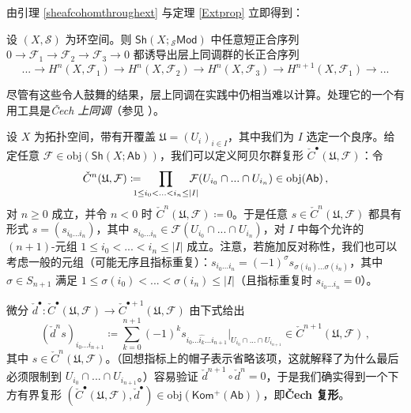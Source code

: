 由引理 \ref{sheafcohomthroughext} 与定理 \ref{Extprop} 立即得到：

\begin{Cor}\label{longexactforsheafcohomology}
设 $(X,\mathcal{S})$ 为环空间。则 $\mathsf{Sh}(X;{}_{\mathcal{S}}\mathsf{Mod})$ 中任意短正合序列 $0\rightarrow\mathcal{F}_1\rightarrow\mathcal{F}_2\rightarrow\mathcal{F}_3\rightarrow 0$ 都诱导出层上同调群的长正合序列
\[
...\rightarrow H^n(X,\mathcal{F}_1)\rightarrow H^n(X,\mathcal{F}_2)\rightarrow H^n(X,\mathcal{F}_3)\rightarrow H^{n+1}(X,\mathcal{F}_1)\rightarrow...
\]
\end{Cor}

\vspace*{0.5cm}
\noindent 尽管有这些令人鼓舞的结果，层上同调在实践中仍相当难以计算。处理它的一个有用工具是\textit{\v{C}ech 上同调}（参见 \cite[section III.4]{[Har77]}）。

\begin{Def}
设 $X$ 为拓扑空间，带有开覆盖 $\mathfrak{U}=(U_i)_{i\in I}$，其中我们为 $I$ 选定一个良序。给定任意 $\mathcal{F}\in\text{obj}(\mathsf{Sh}(X;\mathsf{Ab}))$，我们可以定义阿贝尔群复形 $\check{C}^\bullet(\mathfrak{U},\mathcal{F})$：令
\begin{equation}\label{Cechcomplex}
	\check{C}^n(\mathfrak{U},\mathcal{F})\coloneqq\mkern-18mu\prod_{\begin{small}1\leq i_0<...<i_n\leq |I|\end{small}}\mkern-18mu\mathcal{F}(U_{i_0}\cap ...\cap U_{i_n})\in\text{obj}(\mathsf{Ab})\,,
\end{equation}
对 $n\geq 0$ 成立，并令 $n<0$ 时 $\check{C}^n(\mathfrak{U},\mathcal{F})\coloneqq 0$。于是任意 $s\in \check{C}^n(\mathfrak{U},\mathcal{F})$ 都具有形式 $s=(s_{i_0...i_n})$，其中 $s_{i_0...i_n}\in\mathcal{F}(U_{i_0}\cap ...\cap U_{i_n})$，对 $I$ 中每个允许的 $(n+1)$-元组 $1\leq i_0<...<i_n\leq |I|$ 成立。注意，若施加反对称性，我们也可以考虑一般的元组（可能无序且指标重复）：$s_{i_0...i_n}=(-1)^\sigma s_{\sigma(i_0)...\sigma(i_n)}$，其中 $\sigma\in S_{n+1}$ 满足 $1\leq \sigma(i_0)<...<\sigma(i_n)\leq |I|$（且指标重复时 $s_{i_0...i_n}=0$）。

微分 $\check{d}^\bullet:\check{C}^\bullet(\mathfrak{U},\mathcal{F})\rightarrow \check{C}^{\bullet+1}(\mathfrak{U},\mathcal{F})$ 由下式给出
\begin{equation}\label{Cechdifferential}
	(\check{d}^n s)_{i_0...i_{n+1}}\coloneqq \sum_{k=0}^{n+1}(-1)^k s_{i_0...\hat{i_k}...i_{n+1}}|_{U_{i_0}\cap...\cap U_{i_{n+1}}}\in \check{C}^{n+1}(\mathfrak{U},\mathcal{F})\,,
\end{equation}
其中 $s\in \check{C}^n(\mathfrak{U},\mathcal{F})$。（回想指标上的帽子表示省略该项，这就解释了为什么最后必须限制到 $U_{i_0}\cap...\cap U_{i_{n+1}}$。）容易验证 $\check{d}^{n+1}\circ \check{d}^n=0$，于是我们确实得到一个下方有界复形 $(\check{C}^\bullet(\mathfrak{U},\mathcal{F}),\check{d}^\bullet)\in\text{obj}(\mathsf{Kom^+(Ab)})$，即\textbf{\v{C}ech 复形}。
\end{Def}

